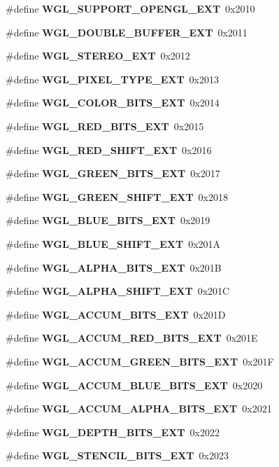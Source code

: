 \begin{DoxyCompactItemize}
\#define {\bf W\+G\+L\+\_\+\+S\+U\+P\+P\+O\+R\+T\+\_\+\+O\+P\+E\+N\+G\+L\+\_\+\+E\+XT}~0x2010
\item 
\#define {\bf W\+G\+L\+\_\+\+D\+O\+U\+B\+L\+E\+\_\+\+B\+U\+F\+F\+E\+R\+\_\+\+E\+XT}~0x2011
\item 
\#define {\bf W\+G\+L\+\_\+\+S\+T\+E\+R\+E\+O\+\_\+\+E\+XT}~0x2012
\item 
\#define {\bf W\+G\+L\+\_\+\+P\+I\+X\+E\+L\+\_\+\+T\+Y\+P\+E\+\_\+\+E\+XT}~0x2013
\item 
\#define {\bf W\+G\+L\+\_\+\+C\+O\+L\+O\+R\+\_\+\+B\+I\+T\+S\+\_\+\+E\+XT}~0x2014
\item 
\#define {\bf W\+G\+L\+\_\+\+R\+E\+D\+\_\+\+B\+I\+T\+S\+\_\+\+E\+XT}~0x2015
\item 
\#define {\bf W\+G\+L\+\_\+\+R\+E\+D\+\_\+\+S\+H\+I\+F\+T\+\_\+\+E\+XT}~0x2016
\item 
\#define {\bf W\+G\+L\+\_\+\+G\+R\+E\+E\+N\+\_\+\+B\+I\+T\+S\+\_\+\+E\+XT}~0x2017
\item 
\#define {\bf W\+G\+L\+\_\+\+G\+R\+E\+E\+N\+\_\+\+S\+H\+I\+F\+T\+\_\+\+E\+XT}~0x2018
\item 
\#define {\bf W\+G\+L\+\_\+\+B\+L\+U\+E\+\_\+\+B\+I\+T\+S\+\_\+\+E\+XT}~0x2019
\item 
\#define {\bf W\+G\+L\+\_\+\+B\+L\+U\+E\+\_\+\+S\+H\+I\+F\+T\+\_\+\+E\+XT}~0x201A
\item 
\#define {\bf W\+G\+L\+\_\+\+A\+L\+P\+H\+A\+\_\+\+B\+I\+T\+S\+\_\+\+E\+XT}~0x201B
\item 
\#define {\bf W\+G\+L\+\_\+\+A\+L\+P\+H\+A\+\_\+\+S\+H\+I\+F\+T\+\_\+\+E\+XT}~0x201C
\item 
\#define {\bf W\+G\+L\+\_\+\+A\+C\+C\+U\+M\+\_\+\+B\+I\+T\+S\+\_\+\+E\+XT}~0x201D
\item 
\#define {\bf W\+G\+L\+\_\+\+A\+C\+C\+U\+M\+\_\+\+R\+E\+D\+\_\+\+B\+I\+T\+S\+\_\+\+E\+XT}~0x201E
\item 
\#define {\bf W\+G\+L\+\_\+\+A\+C\+C\+U\+M\+\_\+\+G\+R\+E\+E\+N\+\_\+\+B\+I\+T\+S\+\_\+\+E\+XT}~0x201F
\item 
\#define {\bf W\+G\+L\+\_\+\+A\+C\+C\+U\+M\+\_\+\+B\+L\+U\+E\+\_\+\+B\+I\+T\+S\+\_\+\+E\+XT}~0x2020
\item 
\#define {\bf W\+G\+L\+\_\+\+A\+C\+C\+U\+M\+\_\+\+A\+L\+P\+H\+A\+\_\+\+B\+I\+T\+S\+\_\+\+E\+XT}~0x2021
\item 
\#define {\bf W\+G\+L\+\_\+\+D\+E\+P\+T\+H\+\_\+\+B\+I\+T\+S\+\_\+\+E\+XT}~0x2022
\item 
\#define {\bf W\+G\+L\+\_\+\+S\+T\+E\+N\+C\+I\+L\+\_\+\+B\+I\+T\+S\+\_\+\+E\+XT}~0x2023

\end{DoxyCompactItemize}
